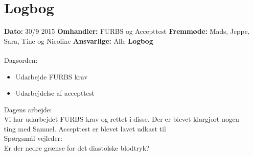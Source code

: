 \chapter{Logbog}

\textbf{Dato:} 30/9 2015 
\textbf{Omhandler:} FURBS og Accepttest
\textbf{Fremmøde:} Mads, Jeppe, Sara, Tine og Nicoline
\textbf{Ansvarlige:} Alle
\textbf{Logbog}
\\
\\
Dagsorden:
\begin{itemize}
	\item Udarbejde FURBS krav
	\item Udarbejdelse af accepttest
\end{itemize}

Dagens arbejde: \\
Vi har udarbejdet FURBS krav og rettet i disse.  
Der er blevet klargjort nogen ting med Samuel.
Accepttest er blevet lavet udkast til\\


Spørgsmål vejleder: \\
Er der nedre grænse for det diastolske blodtryk?\\

